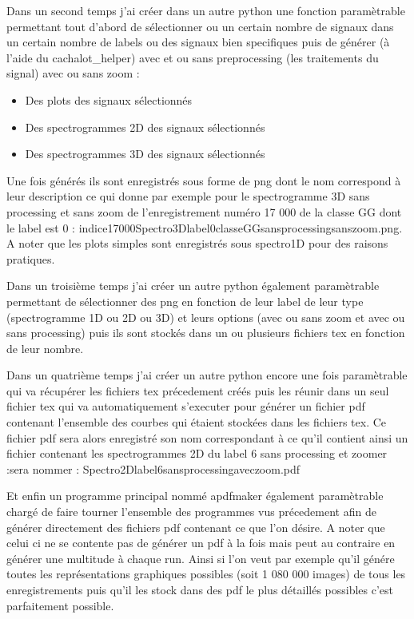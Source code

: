 Dans un second temps j'ai créer dans un autre python une fonction paramètrable permettant tout d'abord de sélectionner ou un certain nombre de signaux dans un certain nombre de labels ou des signaux bien specifiques puis de générer (à l'aide du cachalot{\_}helper) avec et ou sans preprocessing (les traitements du signal) avec ou sans zoom :
\begin{itemize}
\item Des plots des signaux sélectionnés
\item Des spectrogrammes 2D des signaux sélectionnés
\item Des spectrogrammes 3D des signaux sélectionnés
\end{itemize}
Une fois générés ils sont enregistrés sous forme de png dont le nom correspond à leur description ce qui donne par exemple pour le spectrogramme 3D sans processing et sans zoom de l'enregistrement numéro 17 000 de la classe GG dont le label est 0 :
indice17000Spectro3Dlabel0classeGGsansprocessingsanszoom.png. A noter que les plots simples sont enregistrés sous spectro1D pour des raisons pratiques.

Dans un troisième temps j'ai créer un autre python également paramètrable permettant de sélectionner des png en fonction de leur label de leur type (spectrogramme 1D ou 2D ou 3D) et leurs options (avec ou sans zoom et avec ou sans processing) puis ils sont stockés dans un ou plusieurs fichiers tex en fonction de leur nombre.

Dans un quatrième temps j'ai créer un autre python encore une fois paramètrable qui va récupérer les fichiers tex précedement créés puis les réunir dans un seul fichier tex qui va automatiquement s'executer pour générer un fichier pdf contenant l'ensemble des courbes qui étaient stockées dans les fichiers tex. Ce fichier pdf sera alors enregistré son nom correspondant à ce qu'il contient ainsi un fichier contenant les spectrogrammes 2D du label 6 sans processing et zoomer :sera nommer : Spectro2Dlabel6sansprocessingaveczoom.pdf

Et enfin un programme principal nommé apdfmaker également paramètrable chargé de faire tourner l'ensemble des programmes vus précedement afin de générer directement des fichiers pdf contenant ce que l'on désire. A noter que celui ci ne se contente pas de générer un pdf à la fois mais peut au contraire en générer une multitude à chaque run. Ainsi si l'on veut par exemple qu'il génére toutes les représentations graphiques possibles (soit 1 080 000 images) de tous les enregistrements puis qu'il les stock dans des pdf le plus détaillés possibles c'est parfaitement possible.
